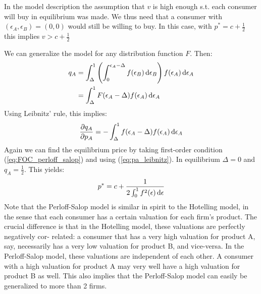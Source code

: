 In the model description the assumption that $v$ is high enough s.t. each consumer will buy in
equilibrium was made. We thus need that a consumer with $(\epsilon_A,\epsilon_B)=(0,0)$ would still
be willing to buy. In this case, with $p^*=c+\frac{1}{2}$ this implies $v>c+ \frac{1}{2}$

We can generalize the model for any distribution function $F$. Then:
\begin{align}
	q_A & = \int_\Delta^1\left(\int_0^{\epsilon_A-\Delta}f(\epsilon_B)\,\textrm{d}\epsilon_B\right)f(\epsilon_A)\,\textrm{d}\epsilon_A \\
	    & = \int_\Delta^1F(\epsilon_A-\Delta)f(\epsilon_A)\,\textrm{d}\epsilon_A
\end{align}
Using Leibnitz' rule, this implies:
\begin{align}
	\frac{\partial q_A}{\partial p_A}=-\int_\Delta^1f(\epsilon_A-\Delta)f(\epsilon_A)\,\textrm{d}\epsilon_A
	\label{eq:pa_leibnitz}
\end{align}
Again we can find the equilibrium price by taking first-order condition (\ref{eq:FOC_perloff_salop})
and using (\ref{eq:pa_leibnitz}). In equilibrium $\Delta=0$ and $q_A= \frac{1}{2}$. This yields:
\begin{align}
	p^*=c+\frac{1}{2\int_0^1f^2(\epsilon)\,\textrm{d}\epsilon}
\end{align}
Note that the Perloff-Salop model is similar in spirit to the Hotelling model, in the
sense that each consumer has a certain valuation for each firm’s product. The crucial
difference is that in the Hotelling model, these valuations are perfectly negatively cor-
related: a consumer that has a very high valuation for product A, say, necessarily has
a very low valuation for product B, and vice-versa. In the Perloff-Salop model, these
valuations are independent of each other. A consumer with a high valuation for product
A may very well have a high valuation for product B as well. This also implies that the
Perloff-Salop model can easily be generalized to more than 2 firms.
